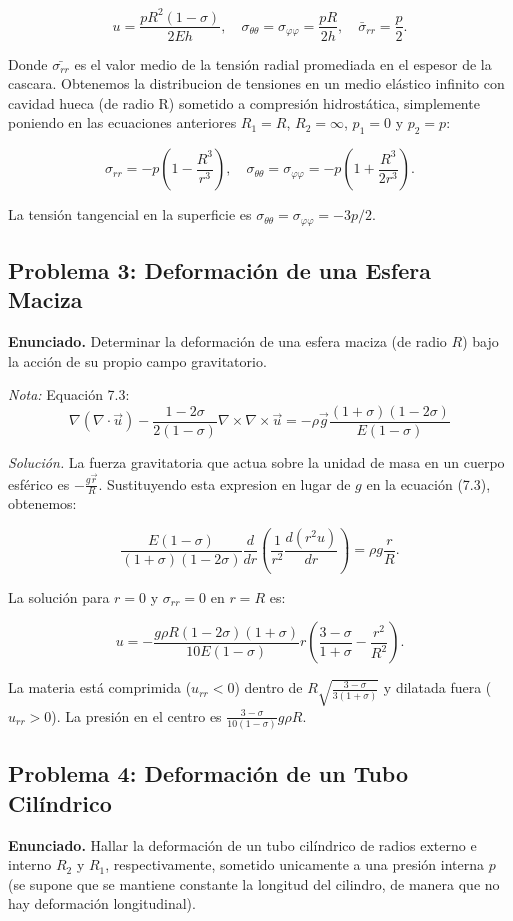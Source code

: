 \documentclass{article}
\begin{document}
$$
u = \frac{p R^2 (1-\sigma)}{2Eh}, \quad \sigma_{\theta\theta} = \sigma_{\varphi\varphi} = \frac{pR}{2h}, \quad \bar{\sigma}_{rr} = \frac{p}{2}.
$$

Donde $\bar{\sigma_{rr}}$ es el valor medio de la tensión radial promediada en el espesor de la cascara. Obtenemos la distribucion de tensiones en un medio elástico infinito con cavidad hueca (de radio R) sometido a compresión hidrostática, simplemente poniendo en las ecuaciones anteriores $R_1 = R$, $R_2 = \infty$, $p_1 = 0$ y $p_2 = p$:

$$
\sigma_{rr} = -p \left(1 - \frac{R^3}{r^3}\right), \quad \sigma_{\theta\theta} = \sigma_{\varphi\varphi} = -p \left(1 + \frac{R^3}{2r^3}\right).
$$

La tensión tangencial en la superficie es $\sigma_{\theta\theta} = \sigma_{\varphi\varphi} = -3p/2$.

\subsection*{Problema 3: Deformación de una Esfera Maciza}
\textbf{Enunciado.} Determinar la deformación de una esfera maciza (de radio $R$) bajo la acción de su propio campo gravitatorio.

\textit{Nota:} Equación 7.3: 
$$ \nabla (\nabla \cdot \vec{u}) - \frac{1-2\sigma}{2(1-\sigma)}\nabla \times \nabla \times \vec{u} = -\rho \vec{g}\frac{(1+\sigma)(1-2\sigma)}{E(1-\sigma)}$$

\textit{Solución.} La fuerza gravitatoria que actua sobre la unidad de masa en un cuerpo esférico es $-\frac{g\vec{r}}{R}$. Sustituyendo esta expresion en lugar de $g$ en la ecuación (7.3), obtenemos:

$$
\frac{E(1-\sigma)}{(1+\sigma)(1-2\sigma)} \frac{d}{dr} \left( \frac{1}{r^2} \frac{d(r^2 u)}{dr} \right) = \rho g \frac{r}{R}.
$$

La solución para $r = 0$ y $\sigma_{rr} = 0$ en $r = R$ es:

$$
u = -\frac{g\rho R(1-2\sigma)(1+\sigma)}{10E(1-\sigma)} r \left(\frac{3-\sigma}{1+\sigma} - \frac{r^2}{R^2}\right).
$$

La materia está comprimida ($u_{rr} < 0$) dentro de $R\sqrt{\frac{3-\sigma}{3(1+\sigma)}}$ y dilatada fuera ($u_{rr} > 0$). La presión en el centro es $\frac{3-\sigma}{10(1-\sigma)} g \rho R$.

\subsection*{Problema 4: Deformación de un Tubo Cilíndrico}
\textbf{Enunciado.} Hallar la deformación de un tubo cilíndrico de radios externo e interno $R_2$ y $R_1$, respectivamente, sometido unicamente a una presión interna $p$ (se supone que se mantiene constante la longitud del cilindro, de manera que no hay deformación longitudinal).
\end{document}
